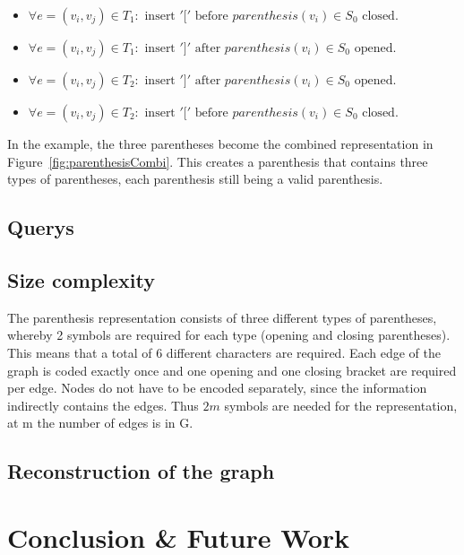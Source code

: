 \documentclass[a4paper]{scrartcl}
\begin{document}
\begin{itemize}
	\item $\forall e=(v_i,v_j)\in T_1: \text{ insert } '[' \text{ before } parenthesis(v_i)\in S_0 \text{ closed.}$
	\item $\forall e=(v_i,v_j)\in T_1: \text{ insert } ']' \text{ after } parenthesis(v_i)\in S_0 \text{ opened.}$
	\item $\forall e=(v_i,v_j)\in T_2: \text{ insert } ']' \text{ after } parenthesis(v_i)\in S_0 \text{ opened.}$
	\item $\forall e=(v_i,v_j)\in T_2: \text{ insert } '[' \text{ before } parenthesis(v_i)\in S_0 \text{ closed.}$
\end{itemize}
In the example, the three parentheses become the combined representation in Figure~\ref{fig:parenthesisCombi}.
This creates a parenthesis that contains three types of parentheses, each parenthesis still being a valid parenthesis.


\subsection{Querys}

\subsection{Size complexity}

The parenthesis representation consists of three different types of parentheses, whereby 2 symbols are required for each type (opening and closing parentheses). This means that a total of 6 different characters are required. Each edge of the graph is coded exactly once and one opening and one closing bracket are required per edge. Nodes do not have to be encoded separately, since the information indirectly contains the edges. Thus $2m$ symbols are needed for the representation, at m the number of edges is in G.


\subsection{Reconstruction of the graph}


\section{Conclusion \& Future Work}



\pagebreak


\printbibliography
\end{document}
